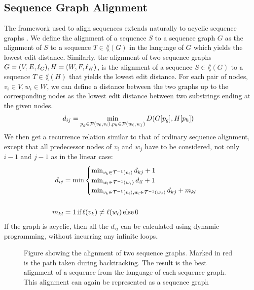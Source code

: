 \subsection{Sequence Graph Alignment}
The framework used to align sequences extends naturally to acyclic sequence graphs \cite{hein, poa}.
We define the alignment of a sequence $S$ to a sequence graph $G$ as the alignment of $S$ to a sequence $T \in \lang(G)$ in the language of $G$ which yields the lowest edit distance.
Similarly, the alignment of two sequence graphs $G=(V, E, \slabel_G), H=(W, F, \slabel_H)$, is the alignment of a sequence $S \in \lang(G)$ to a sequence $T \in \lang(H)$ that yields the lowest edit distance.
For each pair of nodes, $v_i \in V, w_i \in W$, we can define a distance between the two graphs up to the corresponding nodes as the lowest edit distance between two substrings ending at the given nodes.
\[
  d_{ij} = \min_{p_g \in \paths(v_0, v_i), p_h \in \paths(w_0, w_j)} D(G[p_g], H[p_h])
\]
We then get a recurrence relation similar to that of ordinary sequence alignment, except that all predecessor nodes of $v_i$ and $w_j$ have to be considered, not only $i-1$ and $j-1$ as in the linear case:
\begin{align*}
  d_{ij} &= \min \begin{cases}
    \min_{v_k \in \preds(v_i)} d_{kj} + 1\\
    \min_{w_l \in \preds(w_i)} d_{il} +1 \\
    \min_{v_k \in \preds(v_i), w_l \in \preds(w_j)} d_{kj}+m_{kl}\\
  \end{cases}\\
\\
    m_{kl} &= 1\, \text{if}\, \slabel(v_k) \neq \slabel(w_l)\, \text{else}\, 0\\    
\end{align*}
If the graph is acyclic, then all the $d_{ij}$ can be calculated using dynamic programming, without incurring any infinite loops.
\begin{figure}
  \begin{tikzpicture}
    
  \end{tikzpicture}
  \caption{
    Figure showing the alignment of two sequence graphs.
    Marked in red is the path taken during backtracking.
    The result is the best alignment of a sequence from the language of each sequence graph.
    This alignment can again be represented as a sequence graph}
    \label{fig:seqgrapha}
\end{figure}

